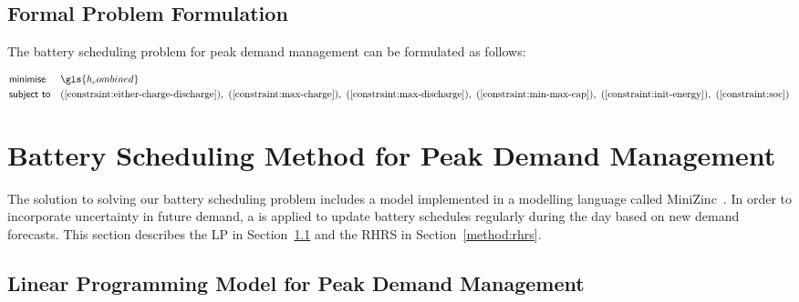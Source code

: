 \subsection{Formal Problem Formulation}

The battery scheduling problem for peak demand management can be formulated as follows:

\begin{equation*}
	\label{problem}
	\begin{aligned}
		& {\textsf{minimise}}
		& &  \gls{h_combined}   \\
		& \textsf{subject to}
		& & 
		(\ref{constraint:either-charge-discharge}), 
		~(\ref{constraint:max-charge}), 
		~(\ref{constraint:max-discharge}), 
		~(\ref{constraint:min-max-cap}), 
		~(\ref{constraint:init-energy}), 
		~(\ref{constraint:soc})\\
	\end{aligned}
\end{equation*}

\section{Battery Scheduling Method for Peak Demand Management}
\label{pdm:method}

The solution to solving our battery scheduling problem includes a  model implemented in a modelling language called MiniZinc~\cite{Stuckey2018}. In order to incorporate uncertainty in future demand, a  is applied to update battery schedules regularly during the day based on new demand forecasts.  This section describes the \gls{LP} in Section~\ref{pdm:method:model} and the \gls{RHRS} in Section~\ref{method:rhrs}.

\subsection{Linear Programming Model for Peak Demand Management}
\label{pdm:method:model}

